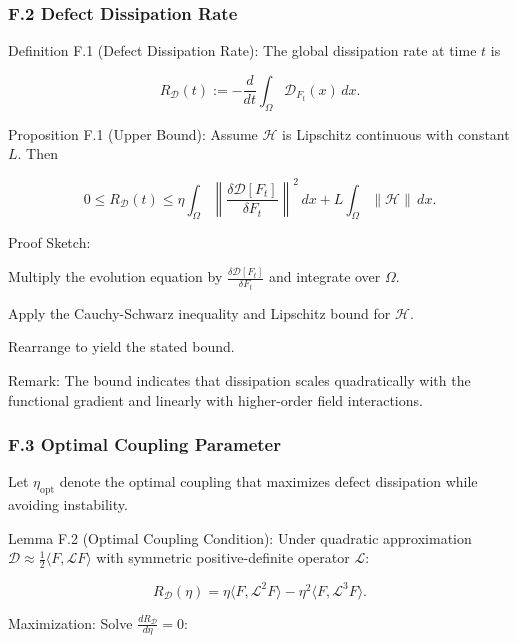 \documentclass[12pt]{article}
\theoremstyle{plain}
\begin{document}
\subsubsection*{F.2 Defect Dissipation Rate}

Definition F.1 (Defect Dissipation Rate):
The global dissipation rate at time \(t\) is

\begin{equation}
R_\mathcal{D}(t) := - \frac{d}{dt} \int_\Omega \mathcal{D}_{F_t}(x) \, dx.
\end{equation}

Proposition F.1 (Upper Bound):
Assume \(\mathcal{H}\) is Lipschitz continuous with constant \(L\). Then

\begin{equation}
0 \le R_\mathcal{D}(t) \le \eta \int_\Omega \left\| \frac{\delta \mathcal{D}[F_t]}{\delta F_t} \right\|^2 \, dx + L \int_\Omega \|\mathcal{H}\| \, dx.
\end{equation}

Proof Sketch:

Multiply the evolution equation by \(\frac{\delta \mathcal{D}[F_t]}{\delta F_t}\) and integrate over \(\Omega\).

Apply the Cauchy-Schwarz inequality and Lipschitz bound for \(\mathcal{H}\).

Rearrange to yield the stated bound.

Remark:
The bound indicates that dissipation scales quadratically with the functional gradient and linearly with higher-order field interactions.

\subsubsection*{F.3 Optimal Coupling Parameter}

Let \(\eta_\mathrm{opt}\) denote the optimal coupling that maximizes defect dissipation while avoiding instability.

Lemma F.2 (Optimal Coupling Condition):
Under quadratic approximation \(\mathcal{D} \approx \frac{1}{2} \langle F, \mathcal{L} F \rangle\) with symmetric positive-definite operator \(\mathcal{L}\):

\begin{equation}
R_\mathcal{D}(\eta) = \eta \langle F, \mathcal{L}^2 F \rangle - \eta^2 \langle F, \mathcal{L}^3 F \rangle.
\end{equation}

Maximization: Solve \(\frac{d R_\mathcal{D}}{d \eta} = 0\):
\end{document}
